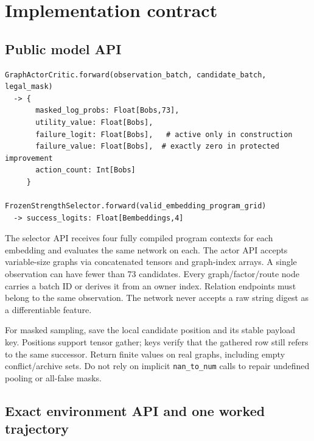 \documentclass[10pt,a4paper]{article}
\begin{document}
\hypertarget{implementation-contract}{%
\section{Implementation contract}\label{implementation-contract}}

\hypertarget{public-model-api}{%
\subsection{Public model API}\label{public-model-api}}

\begin{verbatim}
GraphActorCritic.forward(observation_batch, candidate_batch, legal_mask)
  -> {
       masked_log_probs: Float[Bobs,73],
       utility_value: Float[Bobs],
       failure_logit: Float[Bobs],   # active only in construction
       failure_value: Float[Bobs],  # exactly zero in protected improvement
       action_count: Int[Bobs]
     }

FrozenStrengthSelector.forward(valid_embedding_program_grid)
  -> success_logits: Float[Bembeddings,4]
\end{verbatim}

The selector API receives four fully compiled program contexts for each
embedding and evaluates the same network on each. The actor API accepts
variable-size graphs via concatenated tensors and graph-index arrays. A
single observation can have fewer than 73 candidates. Every
graph/factor/route node carries a batch ID or derives it from an owner
index. Relation endpoints must belong to the same observation. The
network never accepts a raw string digest as a differentiable feature.

For masked sampling, save the local candidate position and its stable
payload key. Positions support tensor gather; keys verify that the
gathered row still refers to the same successor. Return finite values on
real graphs, including empty conflict/archive sets. Do not rely on
implicit \texttt{nan\_to\_num} calls to repair undefined pooling or
all-false masks.


\hypertarget{exact-environment-api-and-one-worked-trajectory}{%
\subsection{Exact environment API and one worked
trajectory}\label{exact-environment-api-and-one-worked-trajectory}}
\end{document}
